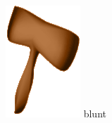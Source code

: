\begin{frame}
\begin{columns}
\begin{column}[b]{0.22\textwidth}
\begin{center}
				\includegraphics[width=\textwidth]{./img/2_mesh/bluntAxeShaded.png}
				\small{blunt}
			\end{center}	
		\end{column}
		\begin{column}[b]{0.22\textwidth}
			\begin{center}

\end{center}
\end{column}
\end{columns}
\end{frame}
